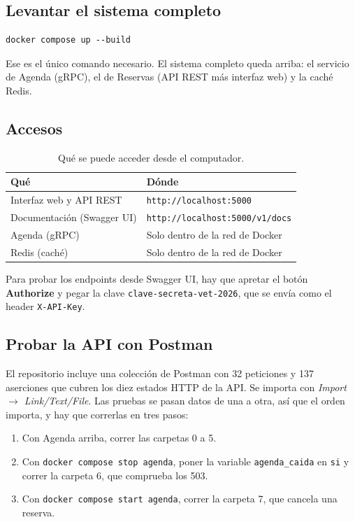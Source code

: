 \documentclass[12pt, a4paper]{article}
\begin{document}
\subsection{Levantar el sistema completo}

\begin{lstlisting}
docker compose up --build
\end{lstlisting}

Ese es el único comando necesario. El sistema completo queda arriba:
el servicio de Agenda (gRPC), el de Reservas (API REST más interfaz web)
y la caché Redis.

\subsection{Accesos}

\begin{table}[H]
\centering
\caption{Qué se puede acceder desde el computador.}
\begin{tabular}{@{}p{4.8cm}p{7.7cm}@{}}
\toprule
\textbf{Qué} & \textbf{Dónde} \\
\midrule
Interfaz web y API REST & \texttt{http://localhost:5000} \\
Documentación (Swagger UI) & \texttt{http://localhost:5000/v1/docs} \\
Agenda (gRPC) & Solo dentro de la red de Docker \\
Redis (caché) & Solo dentro de la red de Docker \\
\bottomrule
\end{tabular}
\end{table}

Para probar los endpoints desde Swagger UI, hay que apretar el botón
\textbf{Authorize} y pegar la clave \texttt{clave-secreta-vet-2026}, que
se envía como el header \texttt{X-API-Key}.

\subsection{Probar la API con Postman}

El repositorio incluye una colección de Postman con 32 peticiones y 137
aserciones que cubren los diez estados HTTP de la API. Se importa con
\emph{Import \texorpdfstring{$\rightarrow$}{->} Link/Text/File}. Las
pruebas se pasan datos de una a otra, así que el orden importa, y hay que
correrlas en tres pasos:

\begin{enumerate}[leftmargin=1.7cm]
    \item Con Agenda arriba, correr las carpetas 0 a 5.
    \item Con \texttt{docker compose stop agenda}, poner la variable
    \texttt{agenda\_caida} en \texttt{si} y correr la carpeta 6, que
    comprueba los 503.
    \item Con \texttt{docker compose start agenda}, correr la carpeta 7,
    que cancela una reserva.
\end{enumerate}
\end{document}

